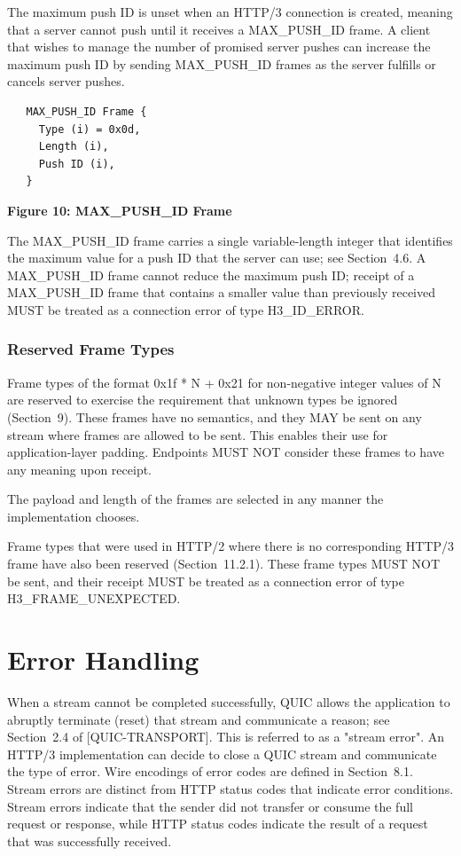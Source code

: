 \documentclass{article}
\begin{document}
The maximum push ID is unset when an HTTP/3 connection is created, meaning that a server cannot push until it receives a MAX\_PUSH\_ID frame.  A client that wishes to manage the number of promised server pushes can increase the maximum push ID by sending MAX\_PUSH\_ID frames as the server fulfills or cancels server pushes.

\begin{verbatim}
   MAX_PUSH_ID Frame {
     Type (i) = 0x0d,
     Length (i),
     Push ID (i),
   }
\end{verbatim}

\begin{center}
\textbf{Figure 10: MAX\_PUSH\_ID Frame}
\end{center}

The MAX\_PUSH\_ID frame carries a single variable-length integer that identifies the maximum value for a push ID that the server can use; see Section~4.6.  A MAX\_PUSH\_ID frame cannot reduce the maximum push ID; receipt of a MAX\_PUSH\_ID frame that contains a smaller value than previously received MUST be treated as a connection error of type H3\_ID\_ERROR.

\subsubsection{Reserved Frame Types}

Frame types of the format 0x1f * N + 0x21 for non-negative integer values of N are reserved to exercise the requirement that unknown types be ignored (Section~9).  These frames have no semantics, and they MAY be sent on any stream where frames are allowed to be sent. This enables their use for application-layer padding.  Endpoints MUST NOT consider these frames to have any meaning upon receipt.

The payload and length of the frames are selected in any manner the implementation chooses.

Frame types that were used in HTTP/2 where there is no corresponding HTTP/3 frame have also been reserved (Section~11.2.1).  These frame types MUST NOT be sent, and their receipt MUST be treated as a connection error of type H3\_FRAME\_UNEXPECTED.

\section{Error Handling}

When a stream cannot be completed successfully, QUIC allows the application to abruptly terminate (reset) that stream and communicate a reason; see Section~2.4 of [QUIC-TRANSPORT].  This is referred to as a "stream error".  An HTTP/3 implementation can decide to close a QUIC stream and communicate the type of error.  Wire encodings of error codes are defined in Section~8.1.  Stream errors are distinct from HTTP status codes that indicate error conditions.  Stream errors indicate that the sender did not transfer or consume the full request or response, while HTTP status codes indicate the result of a request that was successfully received.
\end{document}
